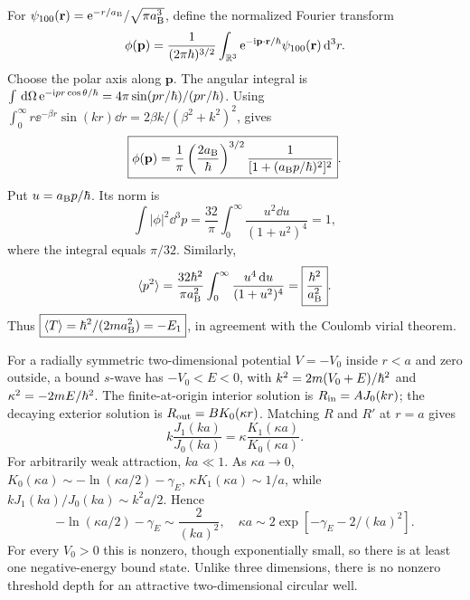 For
$\psi_{100}(\mathbf r)=
\mathrm e^{-r/a_{\mathrm B}}/\sqrt{\pi a_{\mathrm B}^3}$,
define the normalized Fourier transform
\begin{equation}
\phi(\mathbf p)=\frac{1}{(2\pi\hbar)^{3/2}}
\int_{\mathbb R^3}\mathrm e^{-\mathrm i\mathbf p\cdot
\mathbf r/\hbar}\psi_{100}(\mathbf r)\,\mathrm d^3r.
\end{equation}
Choose the polar axis along $\mathbf p$.
The angular integral is
$\int\,\mathrm d\Omega\,\mathrm e^{-\mathrm i pr\cos\theta/\hbar}
=4\pi\sin(pr/\hbar)/(pr/\hbar)$.
Using
$\int_0^\infty r\ee^{-\beta r}\sin(kr)\dd r
=2\beta k/(\beta^2+k^2)^2$, gives
\begin{equation}
\boxed{\phi(\mathbf p)=\frac1\pi
\left(\frac{2a_{\mathrm B}}{\hbar}\right)^{3/2}
\frac1{[1+(a_{\mathrm B} p/\hbar)^2]^2}}.
\end{equation}
Put $u=a_{\mathrm B} p/\hbar$. Its norm is
\begin{equation}
\int|\phi|^2\dd^3p
=\frac{32}{\pi}\int_0^\infty
\frac{u^2\dd u}{(1+u^2)^4}=1,
\end{equation}
where the integral equals $\pi/32$.
Similarly,
\begin{equation}
\langle p^2\rangle=\frac{32\hbar^2}{\pi a_{\mathrm B}^2}
\int_0^\infty\frac{u^4\,\mathrm d u}{(1+u^2)^4}
=\boxed{\frac{\hbar^2}{a_{\mathrm B}^2}}.
\end{equation}
Thus $\boxed{\langle T\rangle=\hbar^2/(2ma_{\mathrm B}^2)=-E_1}$,
in agreement with the Coulomb virial theorem.

For a radially symmetric two-dimensional
potential $V=-V_0$ inside $r<a$
and zero outside, a bound $s$-wave has
$-V_0<E<0$, with
$k^2=2m(V_0+E)/\hbar^2$ and
$\kappa^2=-2mE/\hbar^2$.
The finite-at-origin interior solution is
$R_{\rm in}=AJ_0(kr)$; the decaying exterior
solution is $R_{\rm out}=BK_0(\kappa r)$.
Matching $R$ and $R'$ at $r=a$ gives
\begin{equation}
\boxed{k\frac{J_1(ka)}{J_0(ka)}
=\kappa\frac{K_1(\kappa a)}{K_0(\kappa a)}}.
\end{equation}
For arbitrarily weak attraction, $ka\ll1$.
As $\kappa a\to0$,
$K_0(\kappa a)\sim-\ln(\kappa a/2)-\gamma_E$,
$\kappa K_1(\kappa a)\sim1/a$, while
$kJ_1(ka)/J_0(ka)\sim k^2a/2$.
Hence
\begin{equation}
-\ln(\kappa a/2)-\gamma_E
\sim\frac{2}{(ka)^2},
\quad
\boxed{\kappa a\sim
2\exp[-\gamma_E-2/(ka)^2]}.
\end{equation}
For every $V_0>0$ this is nonzero,
though exponentially small, so there
is at least one negative-energy bound state.
Unlike three dimensions, there is no
nonzero threshold depth for an attractive
two-dimensional circular well.

